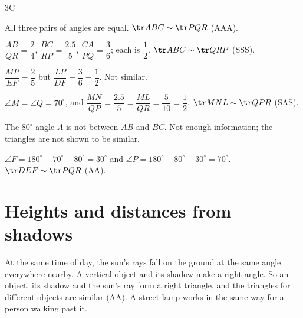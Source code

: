 \begin{exercise}{3C}
\begin{center}
\end{center}
\begin{solution}
\begin{steps}
  \item[(i)] All three pairs of angles are equal. $\tr ABC\sim\tr PQR$ (AAA).
  \item[(ii)] $\dfrac{AB}{QR}=\dfrac24$, $\dfrac{BC}{RP}=\dfrac{2.5}{5}$, $\dfrac{CA}{PQ}=\dfrac36$; each is $\dfrac12$. $\tr ABC\sim\tr QRP$ (SSS).
  \item[(iii)] $\dfrac{MP}{EF}=\dfrac25$ but $\dfrac{LP}{DF}=\dfrac36=\dfrac12$. Not similar.
  \item[(iv)] $\angle M=\angle Q=70^\circ$, and $\dfrac{MN}{QP}=\dfrac{2.5}{5}=\dfrac{ML}{QR}=\dfrac{5}{10}=\dfrac12$. $\tr MNL\sim\tr QPR$ (SAS).
  \item[(v)] The $80^\circ$ angle $A$ is not between $AB$ and $BC$. Not enough information; the triangles are not shown to be similar.
  \item[(vi)] $\angle F=180^\circ-70^\circ-80^\circ=30^\circ$ and $\angle P=180^\circ-80^\circ-30^\circ=70^\circ$. $\tr DEF\sim\tr PQR$ (AA).
\end{steps}
\end{solution}
\end{exercise}
\section{Heights and distances from shadows}

At the same time of day, the sun's rays fall on the ground at the same angle everywhere nearby. A vertical object and its shadow make a right angle. So an object, its shadow and the sun's ray form a right triangle, and the triangles for different objects are similar (AA). A street lamp works in the same way for a person walking past it.

